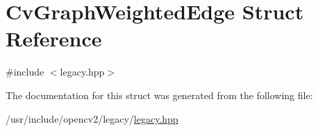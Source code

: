 \hypertarget{structCvGraphWeightedEdge}{\section{Cv\-Graph\-Weighted\-Edge Struct Reference}
\label{structCvGraphWeightedEdge}
}


{\ttfamily \#include $<$legacy.\-hpp$>$}



The documentation for this struct was generated from the following file\-:\begin{DoxyCompactItemize}
\item 
/usr/include/opencv2/legacy/\hyperlink{legacy_8hpp}{legacy.\-hpp}\end{DoxyCompactItemize}

